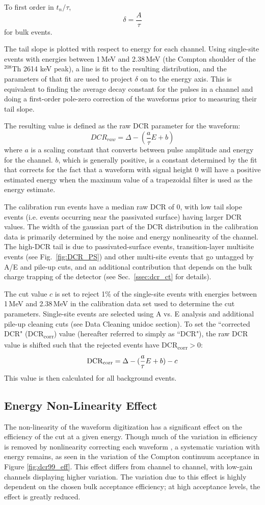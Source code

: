 To first order in $t_n/\tau$, 
$$\delta = \frac{A}{\tau}$$
for bulk events. 

The tail slope is plotted with respect to energy for each channel. Using single-site events with energies between 1\,MeV and 2.38\,MeV (the Compton shoulder of the $^{208}$Th 2614 keV peak), a line is fit to the resulting distribution, and the parameters of that fit are used to project $\delta$ on to the energy axis. This is equivalent to finding the average decay constant for the pulses in a channel and doing a first-order pole-zero correction of the waveforms prior to measuring their tail slope. 

The resulting value is defined as the raw DCR parameter for the waveform:
$$\mathit{DCR_{raw}} = \Delta - (\frac{a}{\tau}E+b)$$
where $a$ is a scaling constant that converts between pulse amplitude and energy for the channel. $b$, which is generally positive, is a constant determined by the fit that corrects for the fact that a waveform with signal height 0 will have a positive estimated energy when the maximum value of a trapezoidal filter is used as the energy estimate. 

The calibration run events have a median raw DCR of 0, with low tail slope events (i.e. events occurring near the passivated surface) having larger DCR values. The width of the gaussian part of the DCR distribution in the calibration data is primarily determined by the noise and energy nonlinearity of the channel. The high-DCR tail is due to passivated-surface events, transition-layer multisite events (see Fig.~\ref{fig:DCR_PS}) and other multi-site events that go untagged by A/E and pile-up cuts, and an additional contribution that depends on the bulk charge trapping of the detector (see Sec.~\ref{ssec:dcr_ct} for details). 

The cut value $c$ is set to reject 1\% of the single-site events with energies between 1\,MeV and 2.38\,MeV in the calibration data set used to determine the cut parameters. Single-site events are selected using  A vs. E analysis and additional pile-up cleaning cuts (see Data Cleaning unidoc section).
To set the ``corrected DCR" (DCR\textsubscript{corr}) value (hereafter referred to simply as ``DCR"), the raw DCR value is shifted such that the rejected events have DCR\textsubscript{corr}$>0$:
$$\mathrm{DCR}\textsubscript{corr} = \Delta - (\frac{a}{\tau}E+b) - c$$
This value is then calculated for all background events. 


\subsection{Energy Non-Linearity Effect}
The non-linearity of the waveform digitization has a significant effect on the efficiency of the cut at a given energy. Though much of the variation in efficiency is removed by nonlinearity correcting each waveform \cite{EnergyUnidoc}, a systematic variation with energy remains, as seen in the variation of the Compton continuum acceptance in  Figure \ref{fig:dcr99_eff}. This effect differs from channel to channel, with low-gain channels displaying higher variation. The variation due to this effect is highly dependent on the chosen bulk acceptance efficiency; at high acceptance levels, the effect is greatly reduced. 


